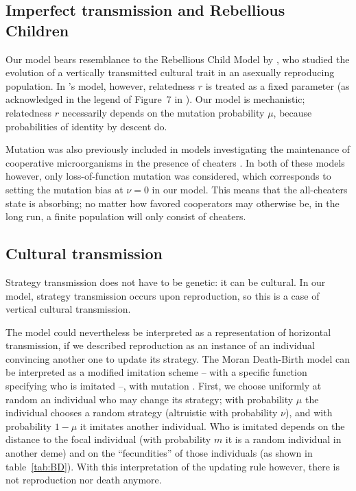 \documentclass[11pt, letterpaper]{article}
\newcommand{\mutbias}{\nu}
\begin{document}
\subsection*{Imperfect transmission and Rebellious Children}
Our model bears resemblance to the Rebellious Child Model by \citet{Frank1997}, who studied the evolution of a vertically transmitted cultural trait in an asexually reproducing population. In \citeauthor{Frank1997}'s model, however, relatedness $r$ is treated as a fixed parameter (as acknowledged in the legend of Figure~7 in \citet{Frank1997}). 
Our model is mechanistic; relatedness $r$ necessarily depends on the mutation probability $\mu$, because probabilities of identity by descent do. 

Mutation was also previously included in models investigating the maintenance of cooperative microorganisms in the presence of cheaters \citep{Brockhurst2007, Frank2010}. In both of these models however, only loss-of-function mutation was considered, which corresponds to setting the mutation bias at $\mutbias=0$ in our model. This means that the all-cheaters state is absorbing; no matter how favored cooperators may otherwise be, in the long run, a finite population will only consist of cheaters. 

\subsection*{Cultural transmission}
Strategy transmission does not have to be genetic: it can be cultural. In our model, strategy transmission occurs upon reproduction, so this is a case of vertical cultural transmission. 

The model could nevertheless be interpreted as a representation of horizontal transmission, if we described reproduction as an instance of an individual convincing another one to update its strategy. The Moran Death-Birth model can be interpreted as a modified imitation scheme \citep{BoydRicherson2002, Ohtsuki2006} -- with a specific function specifying who is imitated --, with mutation \citep{Kandori1993}. First, we choose uniformly at random an individual who may change its strategy; with probability $\mu$ the individual chooses a random strategy (altruistic with probability $\mutbias$), and with probability $1-\mu$ it imitates another individual. Who is imitated depends on the distance to the focal individual (with probability $m$ it is a random individual in another deme) and on the ``fecundities'' of those individuals (as shown in table~\ref{tab:BD}). With this interpretation of the updating rule however, there is not reproduction nor death anymore. 
\end{document}
